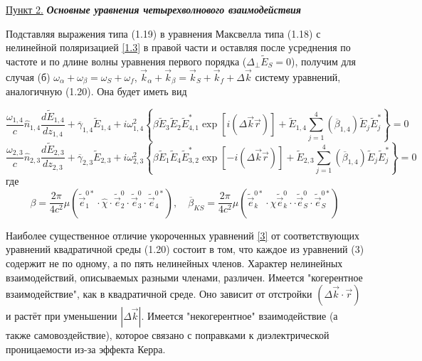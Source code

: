 \documentclass[a4paper]{article}
\begin{document}
	\underline{Пункт 2.} \textbf{\textit{Основные уравнения четырехволнового взаимодействия}}
	
	Подставляя выражения типа (1.19) в уравнения Максвелла типа (1.18) с нелинейной поляризацией \eqref{1.3} в правой части и оставляя после усреднения по частоте и по длине волны уравнения первого порядка   ($\Delta_{\perp}\tilde{E}_{S}=0$), получим для случая (б) $\omega_{\alpha}+\omega_{\beta}=\omega_{S}+\omega_{f}$, $\vec{k}_{\alpha}+\vec{k}_{\beta}=\vec{k}_{S}+\vec{k}_{f}+\Delta\vec{k}$  систему уравнений, аналогичную (1.20). Она будет иметь вид 

	\begin{equation*}
		\frac{\omega_{1,4}}{c}\hat{n}_{1,4}\frac{d\tilde{E}_{1,4}}{dz_{1,4}}+\overline{\gamma}_{1,4}\tilde{E}_{1,4}+i\omega^{2}_{1,4}\left\{\beta\tilde{E}_{3}\tilde{E}_{2}\tilde{E}_{4,1}^{*}\exp\left[i\left(\Delta\vec{k}\vec{r}\right)\right]+\tilde{E}_{1,4}\sum_{j=1}^{4}(\overline{\beta}_{1,4})\tilde{E}_{j}\tilde{E}_{j}^{*}\right\}=0
	\end{equation*}
	\begin{equation}
		\frac{\omega_{2,3}}{c}\hat{n}_{2,3}\frac{d\tilde{E}_{2,3}}{dz_{2,3}}+\overline{\gamma}_{2,3}\tilde{E}_{2,3}+i\omega^{2}_{2,3}\left\{\beta\tilde{E}_{1}\tilde{E}_{4}\tilde{E}_{3,2}^{*}\exp\left[-i\left(\Delta\vec{k}\vec{r}\right)\right]+\tilde{E}_{2,3}\sum_{j=1}^{4}(\overline{\beta}_{1,4})\tilde{E}_{j}\tilde{E}_{j}^{*}\right\}=0 	\label{3}
	\end{equation}
	где $$\beta=\frac{2\pi}{4c^{2}}\mu\left(\tilde{\vec{e}}_{1}^{0*}\cdot\hat{\chi}\cdot\tilde{\vec{e}}_{2}^{0}\cdot\tilde{\vec{e}}_{3}^{0}\cdot\tilde{\vec{e}}_{4}^{0*}\right),\quad\overline{\beta}_{KS}=\frac{2\pi}{4c^{2}}\mu\left(\tilde{\vec{e}}_{k}^{0*}\cdot\hat{\chi}\tilde{\vec{e}}_{k}^{0}\cdot\cdot\tilde{\vec{e}}_{S}^{0}\cdot\tilde{\vec{e}}_{S}^{0*}\right)$$

	Наиболее существенное отличие укороченных уравнений \eqref{3} от соответствующих уравнений квадратичной среды (1.20) состоит в том, что каждое из уравнений (3) содержит не по одному, а по пять нелинейных членов. Характер нелинейных взаимодействий, описываемых разными членами, различен. Имеется "когерентное взаимодействие", как в квадратичной среде. Оно зависит от отстройки $(\Delta\vec{k}\cdot\vec{r})$ и растёт при уменьшении  $|\Delta\vec{k}|$. Имеется "некогерентное" взаимодействие (а также самовоздействие), которое связано с поправками к диэлектрической проницаемости из-за эффекта Керра. 
\end{document}
